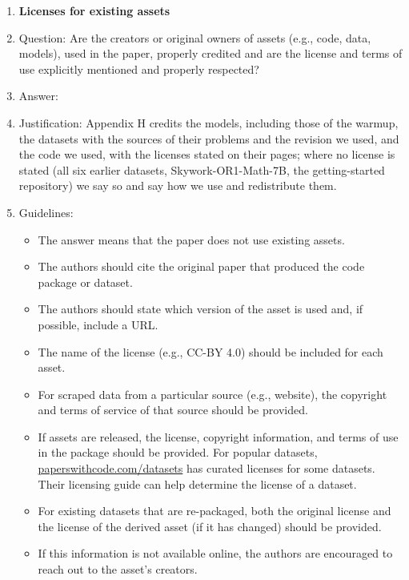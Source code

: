 \begin{enumerate}
\item {\bf Licenses for existing assets}
    \item[] Question: Are the creators or original owners of assets (e.g., code, data, models), used in the paper, properly credited and are the license and terms of use explicitly mentioned and properly respected?
    \item[] Answer: \answerYes{}
    \item[] Justification: Appendix H credits the models, including those of the warmup, the datasets with the sources of their problems and the revision we used, and the code we used, with the licenses stated on their pages; where no license is stated (all six earlier datasets, Skywork-OR1-Math-7B, the getting-started repository) we say so and say how we use and redistribute them.
    \item[] Guidelines:
    \begin{itemize}
        \item The answer \answerNA{} means that the paper does not use existing assets.
        \item The authors should cite the original paper that produced the code package or dataset.
        \item The authors should state which version of the asset is used and, if possible, include a URL.
        \item The name of the license (e.g., CC-BY 4.0) should be included for each asset.
        \item For scraped data from a particular source (e.g., website), the copyright and terms of service of that source should be provided.
        \item If assets are released, the license, copyright information, and terms of use in the package should be provided. For popular datasets, \url{paperswithcode.com/datasets} has curated licenses for some datasets. Their licensing guide can help determine the license of a dataset.
        \item For existing datasets that are re-packaged, both the original license and the license of the derived asset (if it has changed) should be provided.
        \item If this information is not available online, the authors are encouraged to reach out to the asset's creators.
    \end{itemize}


\end{enumerate}
